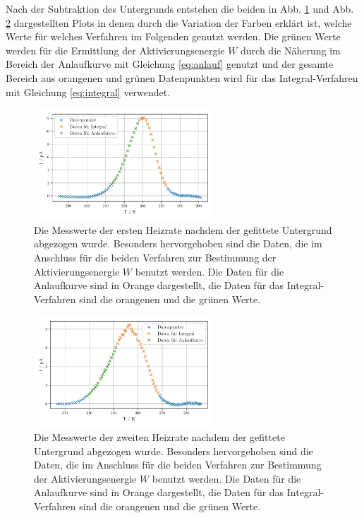 Nach der Subtraktion des Untergrunds entstehen die beiden in Abb. \ref{abb:wo_bkg1} und Abb. \ref{abb:wo_bkg2} dargestellten Plots in denen durch die Variation der Farben erklärt ist, welche Werte für welches Verfahren im Folgenden genutzt werden. Die grünen Werte werden für die Ermittlung der Aktivierungsenergie $W$ durch die Näherung im Bereich der Anlaufkurve mit Gleichung \eqref{eq:anlauf} genutzt und der gesamte Bereich aus orangenen und grünen Datenpunkten wird für das Integral-Verfahren mit Gleichung \eqref{eq:integral} verwendet. 
\begin{figure}
    \centering
    \includegraphics[width=0.6\textwidth]{figures/data_wo_bkg1.pdf}
    \caption{Die Messwerte der ersten Heizrate nachdem der gefittete Untergrund abgezogen wurde. Besonders hervorgehoben sind die Daten, die im Anschluss für die beiden Verfahren zur Bestimmung der Aktivierungsenergie $W$ benutzt werden. Die Daten für die Anlaufkurve sind in Orange dargestellt, die Daten für das Integral-Verfahren sind die orangenen und die grünen Werte.}
    \label{abb:wo_bkg1}
\end{figure}
\begin{figure}
    \centering
    \includegraphics[width=0.6\textwidth]{figures/data_wo_bkg2.pdf}
    \caption{Die Messwerte der zweiten Heizrate nachdem der gefittete Untergrund abgezogen wurde. Besonders hervorgehoben sind die Daten, die im Anschluss für die beiden Verfahren zur Bestimmung der Aktivierungsenergie $W$ benutzt werden. Die Daten für die Anlaufkurve sind in Orange dargestellt, die Daten für das Integral-Verfahren sind die orangenen und die grünen Werte.}
    \label{abb:wo_bkg2}
\end{figure}
